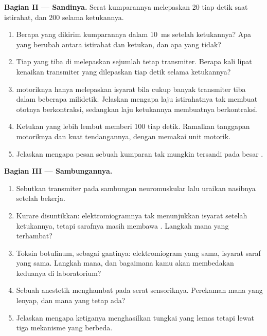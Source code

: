 \begin{problem}
\medskip
\noindent\textbf{Bagian II --- Sandinya.}
Serat kumparannya melepaskan 20  tiap detik saat
istirahat, dan 200 selama ketukannya.
\begin{enumerate}[resume]
  \item Berapa  yang dikirim kumparannya dalam
        \qty{10}{ms} setelah ketukannya? Apa yang berubah antara
        istirahat dan ketukan, dan apa yang tidak?
  \item Tiap  yang tiba di  melepaskan
        sejumlah tetap transmiter. Berapa kali lipat kenaikan
        transmiter yang dilepaskan tiap detik selama ketukannya?
  \item {} motoriknya hanya melepaskan isyarat bila cukup banyak
        transmiter tiba dalam beberapa milidetik. Jelaskan mengapa laju
        istirahatnya tak membuat ototnya berkontraksi, sedangkan laju
        ketukannya membuatnya berkontraksi.
  \item Ketukan yang lebih lembut memberi 100 tiap detik. Ramalkan
        tanggapan  motoriknya dan kuat tendangannya, dengan
        memakai unit motorik.
  \item Jelaskan mengapa pesan sebuah kumparan tak mungkin tersandi
        pada besar .
\end{enumerate}

\medskip
\noindent\textbf{Bagian III --- Sambungannya.}
\begin{enumerate}[resume]
  \item Sebutkan transmiter pada sambungan neuromuskular lalu uraikan
        nasibnya setelah bekerja.
  \item Kurare disuntikkan: elektromiogramnya tak menunjukkan isyarat
        setelah ketukannya, tetapi sarafnya masih membawa . Langkah mana yang terhambat?
  \item Toksin botulinum, sebagai gantinya: elektromiogram yang sama,
        isyarat saraf yang sama. Langkah mana, dan bagaimana kamu akan
        membedakan keduanya di laboratorium?
  \item Sebuah anestetik menghambat  pada serat
        sensoriknya. Perekaman mana yang lenyap, dan mana yang tetap
        ada?
  \item Jelaskan mengapa ketiganya menghasilkan tungkai yang lemas
        tetapi lewat tiga mekanisme yang berbeda.
\end{enumerate}


\end{problem}
